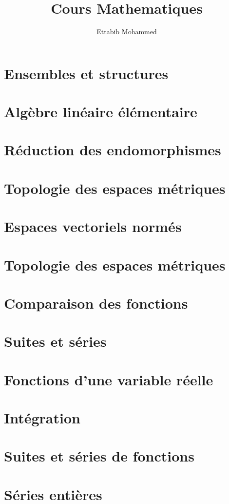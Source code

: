 \documentclass{MathBook}
\begin{document}
\title{Cours Mathematiques}
\author{Ettabib Mohammed}
\date{}
\maketitle
\chapter{Ensembles et structures }
\chapter{ Algèbre linéaire élémentaire}
\chapter{ Réduction des endomorphismes }
\chapter{ Topologie des espaces métriques }
\chapter{Espaces vectoriels normés }
\chapter{Topologie des espaces métriques}
\chapter{Comparaison des fonctions }
\chapter{ Suites et séries }
\chapter{Fonctions d’une variable réelle }
\chapter{Intégration }
\chapter{Suites et séries de fonctions }






\chapter{Séries entières }


\end{document}
